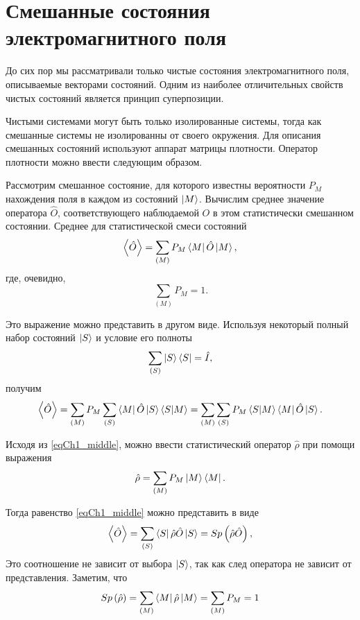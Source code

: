 \section{Смешанные состояния электромагнитного поля}
До сих пор мы рассматривали только чистые состояния электромагнитного
поля, описываемые векторами состояний. 
Одним из наиболее отличительных свойств чистых состояний является
принцип суперпозиции. 

Чистыми системами могут быть только изолированные системы, тогда как
смешанные системы не изолированны от своего окружения. Для описания
смешанных состояний используют аппарат матрицы плотности. Оператор
плотности можно ввести следующим образом.  

Рассмотрим смешанное состояние, 
для которого известны вероятности
$P_M$
нахождения поля в каждом из состояний 
$\ket{M}$.  Вычислим среднее значение
оператора $\hat{O}$,  соответствующего наблюдаемой $O$ в этом статистически
смешанном состоянии. Среднее для статистической смеси состояний  
\begin{equation}
\left<\hat{O}\right> = \sum_{(M)} P_M\bra{M}\hat{O}\ket{M},
\end{equation}
где, очевидно, 
\[
\sum_{(M)} P_M = 1.
\]

Это выражение можно представить в другом виде. Используя некоторый
полный набор состояний $\ket{S}$   и условие его полноты 
\[
\sum_{(S)}\ket{S}\bra{S} = \hat{I},
\]
получим
\begin{equation}
\left<\hat{O}\right> = \sum_{(M)}
P_M\sum_{(S)}\bra{M}\hat{O}\ket{S}\bra{S}\ket{M}
= \sum_{(M)}\sum_{(S)}P_M\bra{S}\ket{M}\bra{M}\hat{O}\ket{S}.
\label{eqCh1_middle}
\end{equation}

Исходя из \eqref{eqCh1_middle}, можно ввести статистический оператор $\hat{\rho}$  при помощи выражения
\begin{equation}
\hat{\rho} = \sum_{(M)}
P_M\ket{M}\bra{M}.
\end{equation}

Тогда равенство \eqref{eqCh1_middle} можно представить в виде
\begin{equation}
\left<\hat{O}\right> = \sum_{(S)}
\bra{S}\hat{\rho}\hat{O}\ket{S} = Sp \left(\hat{\rho}\hat{O}\right),
\end{equation}
Это соотношение не зависит от выбора  $\ket{S}$,  так как след
оператора не зависит от представления. Заметим, что 
\begin{equation}
Sp \left(\hat{\rho}\right) = \sum_{(M)}
\bra{M}\hat{\rho}\ket{M} = \sum_{(M)} P_M = 1
\label{eqCh1_spequal1}
\end{equation}

